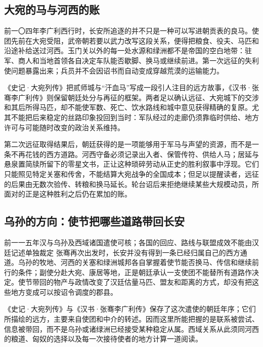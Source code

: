 \subsection{大宛的马与河西的账}

前一〇四年李广利西行时，长安所追逐的并不只是一种可以写进朝贡表的良马。使团先前在大宛受阻，武帝朝若要以武力改写这段关系，便得把粮食、役夫、马匹和沿途补给送过河西。玉门关以外的每一处水源和绿洲都不是帝国的空白地带：驻军、商人和当地首领各自决定车队能否歇脚、换马或继续前进。第一次远征的失利使问题暴露出来；兵员并不会因诏书而自动变成穿越荒漠的运输能力。

《史记·大宛列传》把贰师城与“汗血马”写成一段引人注目的远方故事，《汉书·张骞李广利传》则保留朝廷处分与再征的框架。两者足以确认远征、大宛城下的交涉和其后所得马匹，却不能使军数、死亡、饮水路线和城中意见获得精确的复原。尤其不能把后来稳定的丝路印象投回到当时：军队经过的走廊仍须靠临时供给、地方许可与可能随时改变的政治关系维持。

第二次远征取得结果后，朝廷获得的是一项能够用于军马与声望的资源，而不是一条不再花钱的西方道路。河西守备必须记录出入者、保管传符、供给人马；居延与悬泉置简牍所留下的零星文书，正让这种琐碎劳动从正史的胜利叙事中浮现。它们只能照见特定关塞和传舍，不能结算大宛战争的全国成本；但足以提醒读者，远征的后果由无数次验传、转粮和换马延长。轮台诏后来拒绝继续某些大规模动员，所面对的正是这种胜利之后仍在累加的账。
\subsection{乌孙的方向：使节把哪些道路带回长安}
\begin{event}{}{前一一五年}{汉与乌孙及西域诸国}{遣使可核；各国的回应、路线与联盟成效不能由汉廷记述单独裁定}
张骞再次出发时，长安并没有得到一条已经归属自己的西方通道。乌孙的牧地、河西的关塞和绿洲城邦各自掌握着使节能否换马、传信和继续前行的条件；副使分赴大宛、康居等地，正是朝廷承认一支使团不能替所有道路作决定。使节带回的物产与政情改变了汉廷估量马匹、盟友和距离的方式，却没有把这些地方变成可以按诏令调度的郡县。

《史记·大宛列传》与《汉书·张骞李广利传》保存了这次遣使的朝廷年序；它们所描绘的远方，主要来自使团和中介的转述。因而这里所能把握的是联系被尝试、信息被带回，而不是乌孙或诸绿洲已经接受某种稳定从属。西域关系从此须同河西的粮道、匈奴的选择以及每一次接待使者的地方计算一道阅读。
\end{event}